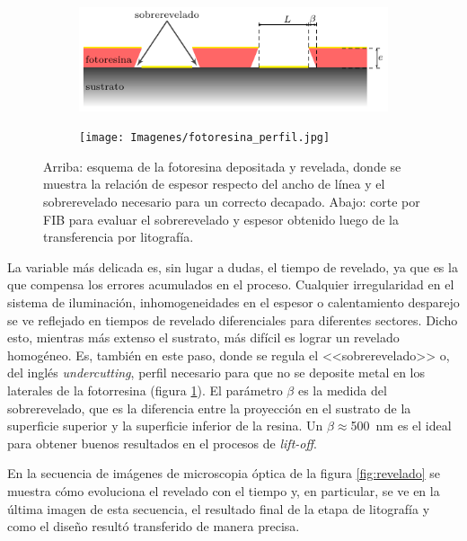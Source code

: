 				\begin{figure}[b!]
 				\centering
 				\begin{subfigure}[t]{0.935\textwidth}
 				\hspace{0.29cm}\includegraphics[width=\textwidth]{Esquemas/altura-ancho.pdf}
 				\end{subfigure}
 				\begin{subfigure}[t]{0.86\textwidth}
 				\texttt{[image: Imagenes/fotoresina\_perfil.jpg]}
 				\end{subfigure}
 				\caption[Perfil de fotorresina para el decapado o\textit{ lift-off}]{Arriba: esquema de la fotoresina depositada y revelada, donde se muestra la relación de espesor respecto del ancho de línea y el sobrerevelado necesario para un correcto decapado. Abajo: corte por FIB para evaluar el sobrerevelado y espesor obtenido luego de la transferencia por litografía.}
 				\label{fig:undercut}
 				\end{figure}

 	   		 La variable más delicada es, sin lugar a dudas, el tiempo de revelado, ya que es la que compensa los errores acumulados en el proceso. Cualquier irregularidad en el sistema de iluminación, inhomogeneidades en el espesor o calentamiento desparejo se ve reflejado en tiempos de revelado diferenciales para diferentes sectores. Dicho esto, mientras más extenso el sustrato, más difícil es lograr un revelado homogéneo. Es, también en este paso, donde se regula el <<sobrerevelado>> o, del inglés \textit{undercutting}, perfil necesario para que no se deposite metal en los laterales de la fotorresina (figura \ref{fig:undercut}). El parámetro $\beta$ es la medida del sobrerevelado, que es la diferencia entre la proyección en el sustrato de la superficie superior y la superficie inferior de la resina. Un $\beta\!\!\approx$\SI{500}{\nm} es el ideal para obtener buenos resultados en el procesos de \textit{lift-off}. 
 
 	         En la secuencia de imágenes de microscopia óptica de la figura \ref{fig:revelado} se muestra cómo evoluciona el revelado con el tiempo y, en particular, se ve en la última imagen de esta secuencia, el resultado final de la etapa de litografía y como el diseño resultó transferido de manera precisa.

